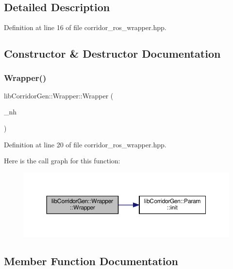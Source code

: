 \subsection{Detailed Description}


Definition at line 16 of file corridor\+\_\+ros\+\_\+wrapper.\+hpp.



\subsection{Constructor \& Destructor Documentation}
\mbox{\label{classlib_corridor_gen_1_1_wrapper_a7f63deeaa58e21123fa14eedb000d7e1}} 
\subsubsection{\texorpdfstring{Wrapper()}{Wrapper()}}
{\footnotesize\ttfamily lib\+Corridor\+Gen\+::\+Wrapper\+::\+Wrapper (\begin{DoxyParamCaption}\item[{const ros\+::\+Node\+Handle \&}]{\+\_\+nh }\end{DoxyParamCaption})\hspace{0.3cm}{\ttfamily [inline]}}



Definition at line 20 of file corridor\+\_\+ros\+\_\+wrapper.\+hpp.

Here is the call graph for this function\+:
\nopagebreak
\begin{figure}[H]
\begin{center}
\leavevmode
\includegraphics[width=350pt]{classlib_corridor_gen_1_1_wrapper_a7f63deeaa58e21123fa14eedb000d7e1_cgraph}
\end{center}
\end{figure}


\subsection{Member Function Documentation}
\mbox{\label{classlib_corridor_gen_1_1_wrapper_a8e09f2a4a14001ae5c7f34adbc813402}} 
